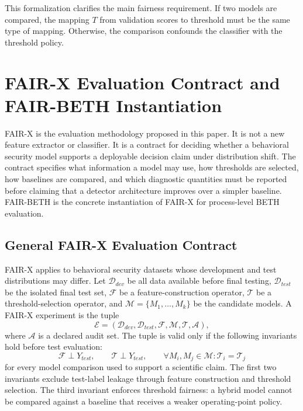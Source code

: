 \documentclass[10pt,journal,compsoc]{IEEEtran}
\begin{document}
This formalization clarifies the main fairness requirement. If two models are compared, the mapping $T$ from validation scores to threshold must be the same type of mapping. Otherwise, the comparison confounds the classifier with the threshold policy.

\section{FAIR-X Evaluation Contract and FAIR-BETH Instantiation}
\label{sec:fairbeth}

FAIR-X is the evaluation methodology proposed in this paper. It is not a new feature extractor or classifier. It is a contract for deciding whether a behavioral security model supports a deployable decision claim under distribution shift. The contract specifies what information a model may use, how thresholds are selected, how baselines are compared, and which diagnostic quantities must be reported before claiming that a detector architecture improves over a simpler baseline. FAIR-BETH is the concrete instantiation of FAIR-X for process-level BETH evaluation.

\subsection{General FAIR-X Evaluation Contract}
\label{sec:fairx_contract}

FAIR-X applies to behavioral security datasets whose development and test distributions may differ. Let $\mathcal{D}_{dev}$ be all data available before final testing, $\mathcal{D}_{test}$ be the isolated final test set, $\mathcal{F}$ be a feature-construction operator, $\mathcal{T}$ be a threshold-selection operator, and $\mathcal{M}=\{M_1,\ldots,M_k\}$ be the candidate models. A FAIR-X experiment is the tuple
\[
\mathcal{E}=(\mathcal{D}_{dev},\mathcal{D}_{test},\mathcal{F},\mathcal{M},\mathcal{T},\mathcal{A}),
\]
where $\mathcal{A}$ is a declared audit set. The tuple is valid only if the following invariants hold before test evaluation:
\[
\mathcal{F}\perp Y_{test}, \qquad \mathcal{T}\perp Y_{test}, \qquad
\forall M_i,M_j\in\mathcal{M}: \mathcal{T}_i=\mathcal{T}_j
\]
for every model comparison used to support a scientific claim. The first two invariants exclude test-label leakage through feature construction and threshold selection. The third invariant enforces threshold fairness: a hybrid model cannot be compared against a baseline that receives a weaker operating-point policy.
\end{document}
